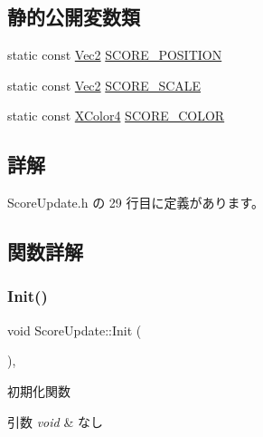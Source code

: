 \subsection*{静的公開変数類}
\begin{DoxyCompactItemize}
\item 
static const \mbox{\hyperlink{_vector3_d_8h_a5ef6e95dfc5f9d3820b71772d99bbc25}{Vec2}} \mbox{\hyperlink{class_score_update_a88bd91fc66dd629a849ab9f0a178150c}{S\+C\+O\+R\+E\+\_\+\+P\+O\+S\+I\+T\+I\+ON}}
\item 
static const \mbox{\hyperlink{_vector3_d_8h_a5ef6e95dfc5f9d3820b71772d99bbc25}{Vec2}} \mbox{\hyperlink{class_score_update_a23e9b8c4c6624cf5f3b66258771b3243}{S\+C\+O\+R\+E\+\_\+\+S\+C\+A\+LE}}
\item 
static const \mbox{\hyperlink{_vector3_d_8h_a680c30c4a07d86fe763c7e01169cd6cc}{X\+Color4}} \mbox{\hyperlink{class_score_update_ab78fc9ad68faf9f5be01096b5d60959e}{S\+C\+O\+R\+E\+\_\+\+C\+O\+L\+OR}}
\end{DoxyCompactItemize}


\subsection{詳解}


 Score\+Update.\+h の 29 行目に定義があります。



\subsection{関数詳解}
\mbox{\label{class_score_update_afd51e11ad00ebc15d9b3139398437afc}} 
\subsubsection{\texorpdfstring{Init()}{Init()}}
{\footnotesize\ttfamily void Score\+Update\+::\+Init (\begin{DoxyParamCaption}{ }\end{DoxyParamCaption})\hspace{0.3cm}{\ttfamily [override]}, {\ttfamily [virtual]}}



初期化関数 


\begin{DoxyParams}{引数}
{\em void} & なし \\
\hline
\end{DoxyParams}

